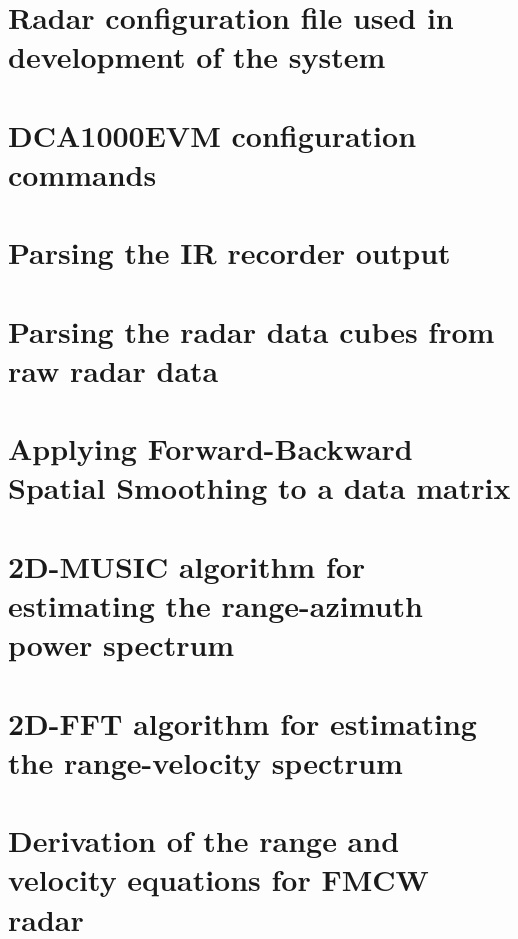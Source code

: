 \documentclass[english, numeric, fleqn]{tauthesis}
\begin{document}
\begin{appendices}

\chapter{Radar configuration file used in development of the system}
\label{app:config}


\chapter{DCA1000EVM configuration commands}
\label{app:dca1000evm-commands}


\chapter{Parsing the IR recorder output}
\label{app:ir-parsing}


\chapter{Parsing the radar data cubes from raw radar data}
\label{app:get_frames}


\chapter{Applying Forward-Backward Spatial Smoothing to a data matrix}
\label{app:fbss-algorithm}


\chapter{2D-MUSIC algorithm for estimating the range-azimuth power spectrum}
\label{app:2d-music-algorithm}


\chapter{2D-FFT algorithm for estimating the range-velocity spectrum}
\label{app:2dfft-range-velocity-example}


\chapter{Derivation of the range and velocity equations for FMCW radar}
\label{app:deriving-range-velocity-fft}



\end{appendices}
\end{document}
